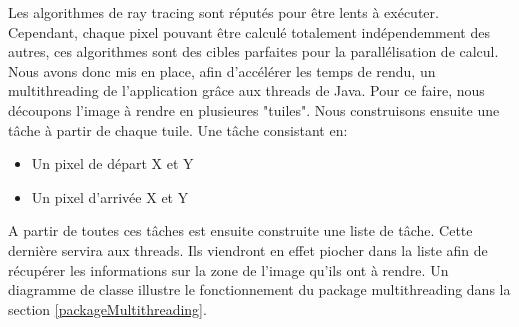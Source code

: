 \documentclass[../../Rapport RayTracer.tex]{subfiles}
\begin{document}
\label{multithreading}
Les algorithmes de ray tracing sont réputés pour être lents à exécuter. Cependant, chaque pixel pouvant être calculé totalement indépendemment des autres, ces algorithmes sont des cibles parfaites pour la parallélisation de calcul. Nous avons donc mis en place, afin d'accélérer les temps de rendu, un multithreading de l'application grâce aux threads de Java. Pour ce faire, nous découpons l'image à rendre en plusieures "tuiles". Nous construisons ensuite une tâche à partir de chaque tuile. Une tâche consistant en:
\begin{itemize}
	\item{Un pixel de départ X et Y}	
	\item{Un pixel d'arrivée X et Y}
\end{itemize}
A partir de toutes ces tâches est ensuite construite une liste de tâche. Cette dernière servira aux threads. Ils viendront en effet piocher dans la liste afin de récupérer les informations sur la zone de l'image qu'ils ont à rendre.
Un diagramme de classe illustre le fonctionnement du package multithreading dans la section \ref{packageMultithreading}.
\end{document}
